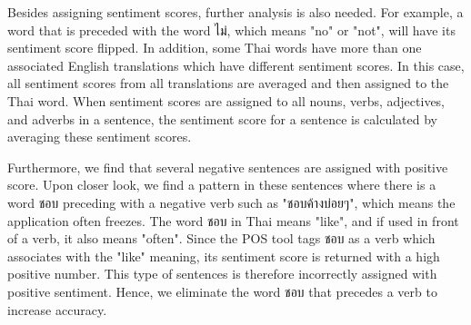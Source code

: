Besides assigning sentiment scores, further analysis is also needed. For example, 
a word that is preceded with the word {ไม่}, which means "no" or "not", will have its sentiment score flipped. In addition, some Thai words have more than one associated English translations which have different sentiment scores. In this case, all sentiment scores from all translations are averaged and then assigned to the Thai word. When sentiment scores are assigned to all nouns, verbs, adjectives, and adverbs in a sentence, the sentiment score for a sentence is calculated by averaging these sentiment scores.

Furthermore, we find that several negative sentences are assigned with positive score. Upon closer look, we find a pattern in these sentences where there is a word {ชอบ} preceding with a negative verb such as "{ชอบค้างบ่อยๆ}", which means the application often freezes. The word {ชอบ} in Thai means "like", and if used in front of a verb, it also means "often". Since the POS tool tags {ชอบ} as a verb which associates with the "like" meaning, its sentiment score is returned with a high positive number. This type of sentences is therefore incorrectly assigned with positive sentiment. Hence, we eliminate the word {ชอบ} that precedes a verb to increase accuracy.


